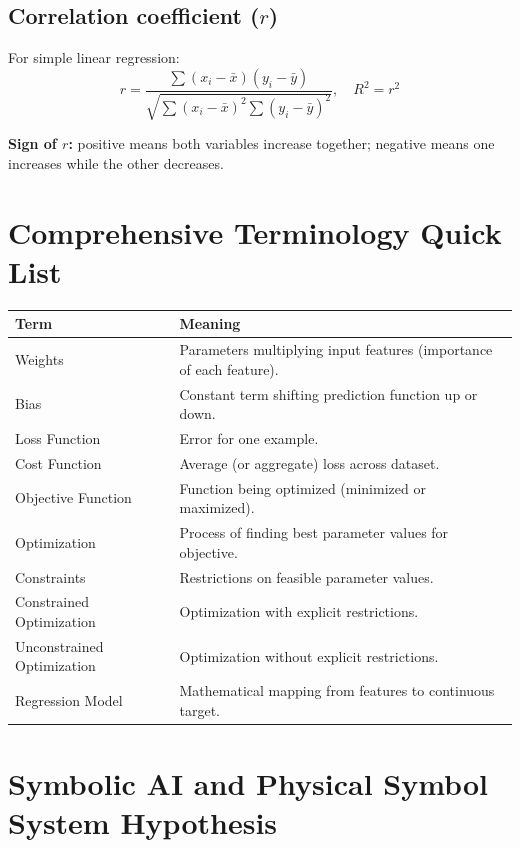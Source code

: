 \documentclass[12pt,a4paper]{article}
\begin{document}
\subsection*{Correlation coefficient ($r$)}
For simple linear regression:
\begin{equation}
r = \frac{\sum (x_i-\bar{x})(y_i-\bar{y})}{\sqrt{\sum (x_i-\bar{x})^2\sum (y_i-\bar{y})^2}},\quad R^2 = r^2
\end{equation}

\textbf{Sign of $r$:} positive means both variables increase together; negative means one increases while the other decreases.

\section{\textcolor{primary}{Comprehensive Terminology Quick List}}

\begin{longtable}{>{\raggedright\arraybackslash}p{}p{}}
\toprule
\textbf{Term} & \textbf{Meaning} \\
\midrule
Weights & Parameters multiplying input features (importance of each feature). \\
Bias & Constant term shifting prediction function up or down. \\
Loss Function & Error for one example. \\
Cost Function & Average (or aggregate) loss across dataset. \\
Objective Function & Function being optimized (minimized or maximized). \\
Optimization & Process of finding best parameter values for objective. \\
Constraints & Restrictions on feasible parameter values. \\
Constrained Optimization & Optimization with explicit restrictions. \\
Unconstrained Optimization & Optimization without explicit restrictions. \\
Regression Model & Mathematical mapping from features to continuous target. \\
\bottomrule
\end{longtable}

\section{\textcolor{primary}{Symbolic AI and Physical Symbol System Hypothesis}}
\end{document}

